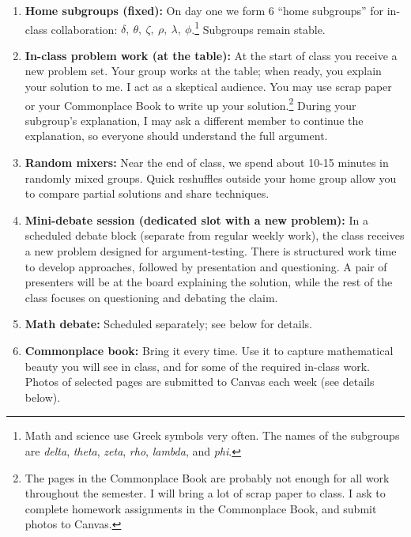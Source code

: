 \documentclass[oneside,11pt]{amsart}
\begin{document}
\begin{enumerate}[$\bullet$]
  \item \textbf{Home subgroups (fixed):} On day one we form 6 ``home subgroups'' for in-class collaboration:
  $\delta, \ \theta, \ \zeta, \ \rho, \ \lambda, \ \phi$.\footnote{Math and science use Greek symbols very often. The names of the subgroups are
	\emph{delta}, \emph{theta}, \emph{zeta}, \emph{rho}, \emph{lambda}, and \emph{phi}.}
	Subgroups remain stable.

  \item \textbf{In-class problem work (at the table):} At
	the start of class you receive a new problem set.
	Your group works at the table; when ready, you explain
	your solution to me. I act as a skeptical audience.
	You may use scrap paper or your Commonplace Book to write up your solution.\footnote{The pages
	in the Commonplace Book are probably not enough for all work throughout the semester. I will bring
	a lot of scrap paper to class. I ask to complete homework assignments in the Commonplace Book, and
	submit photos to Canvas.}
	During your subgroup's explanation, I may ask a different member to continue the explanation,
	so everyone should understand the full argument.

  \item \textbf{Random mixers:}
		Near the end of class, we spend about 10-15 minutes
		in randomly mixed groups.
		Quick reshuffles outside your home group allow you
		to compare partial solutions and share techniques.

	 \item \textbf{Mini-debate session (dedicated slot with a new
	 problem):} In a scheduled debate block (separate from
	 regular weekly work), the class receives a {new}
	 problem designed for argument-testing. There is
	 structured {work time} to develop approaches,
	 followed by {presentation and questioning}.
	 A pair of presenters will be at the board explaining the
	 solution, while the rest of the class
	 focuses on questioning and debating the claim.

	\item \textbf{Math debate:} Scheduled separately; see below for details.

	\item \textbf{Commonplace book:} Bring it every time.
	Use it to capture mathematical beauty you will see in class, and for
	some of the required in-class work.
	Photos of selected pages
	are submitted to Canvas each week (see details below).


\end{enumerate}
\end{document}
